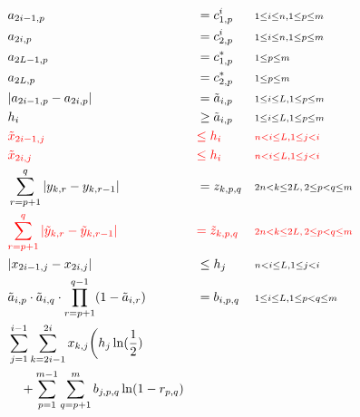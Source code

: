 \documentclass[runningheads]{llncs}
\newcommand{\HL}[1]{\textcolor{red}{#1}}
\begin{document}
\begin{align*}
                 & a_{2i-1,p}                                                         && = c^i_{1,p}          && {\scriptstyle 1 \leq i \leq n, 1 \leq p \leq m}\\
                 & a_{2i,p}                                                           && = c^i_{2,p}          && {\scriptstyle 1 \leq i \leq n, 1 \leq p \leq m}\\
                 & a_{2L-1,p}                                                         && = c^*_{1,p}          && {\scriptstyle 1 \leq p \leq m}\\
                 & a_{2L,p}                                                           && = c^*_{2,p}          && {\scriptstyle 1 \leq p \leq m}\\
                 & |a_{2i-1,p} - a_{2i,p}|                                            && = \tilde{a}_{i,p}    && {\scriptstyle 1 \leq i \leq L, 1 \leq p \leq m}\\
                 & h_i                                                                && \geq \tilde{a}_{i,p} && {\scriptstyle 1 \leq i \leq L, 1 \leq p \leq m}\\
                 & \HL{\tilde{x}_{2i-1,j}}                                            && \HL{\leq h_i}        && \HL{\scriptstyle n < i \leq L, 1 \leq j < i}\\
                 & \HL{\tilde{x}_{2i,j}}                                              && \HL{\leq h_i}        && \HL{\scriptstyle n < i \leq L, 1 \leq j < i}\\
                 & \sum_{r=p+1}^q |y_{k,r} - y_{k,r-1}|                               && = z_{k,p,q}          && {\scriptstyle 2n < k \leq 2L,\, 2 \leq p < q \leq m}\\
                 & \HL{\sum_{r=p+1}^q |\tilde{y}_{k,r} - \tilde{y}_{k,r-1}|}          && \HL{= \tilde{z}_{k,p,q}} && \HL{\scriptstyle 2n < k \leq 2L,\, 2 \leq p < q \leq m}\\
                 & |x_{2i-1,j} - x_{2i,j}|                                            && \leq h_j             && {\scriptstyle n < i \leq L, 1 \leq j < i}\\
                 & \tilde{a}_{i,p}\cdot\tilde{a}_{i,q}\cdot\prod_{r=p+1}^{q-1}(1-\tilde{a}_{i,r}) &&  = b_{i,p,q} && {\scriptstyle 1 \leq i \leq L, 1 \leq p<q \leq m}\\
                 & \sum^{i-1}_{j=1}\sum_{k=2i-1}^{2i}x_{k,j}\bigg(h_j\ln(\frac{1}{2})\\
                 & \quad + \sum_{p=1}^{m-1}\sum_{q=p+1}^m b_{j,p,q}\ln(1-r_{p,q})\\

\end{align*}
\end{document}
